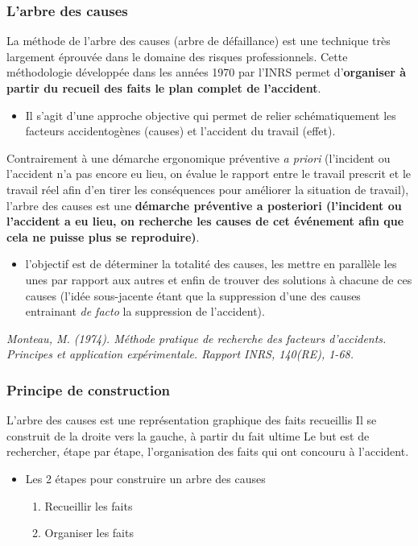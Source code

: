 \documentclass{beamer}
\begin{document}
\begin{frame}
\frametitle{L’arbre des causes}

La méthode de l'arbre des causes (arbre de défaillance) est une technique très largement éprouvée dans le domaine des risques professionnels. Cette méthodologie développée dans les années 1970 par l'INRS permet d’\textbf{organiser à partir du recueil des faits le plan complet de l’accident}.
\begin{itemize}
\item Il s’agit d’une approche objective qui permet de relier schématiquement les facteurs accidentogènes (causes) et l’accident du travail (effet). 
\end{itemize}

Contrairement à une démarche ergonomique préventive \textit{a priori} (l'incident ou l'accident n'a pas encore eu lieu, on évalue le rapport entre le travail prescrit et le travail réel afin d'en tirer les conséquences pour améliorer la situation de travail), l’arbre des causes est une \textbf{démarche préventive a posteriori (l'incident ou l'accident a eu lieu, on recherche les causes de cet événement afin que cela ne puisse plus se reproduire)}. 
\begin{itemize}
\item l’objectif est de déterminer la totalité des causes, les mettre en parallèle les unes par rapport aux autres et enfin de trouver des solutions à chacune de ces causes (l’idée sous-jacente étant que la suppression d'une des causes entrainant \textit{de facto} la suppression de l'accident). 
\end{itemize}
\textit{Monteau, M. (1974). Méthode pratique de recherche des facteurs d'accidents. Principes et application expérimentale. Rapport INRS, 140(RE), 1-68.}
\end{frame}

\begin{frame}
\frametitle{Principe de construction}

L’arbre des causes est une représentation graphique des faits recueillis
Il se construit de la droite vers la gauche, à partir du fait ultime
Le but est de rechercher, étape par étape, l’organisation des faits qui ont concouru à l’accident.
\begin{itemize}
\item Les 2 étapes pour construire un arbre des causes
\begin{enumerate}
	\item Recueillir les faits
\item Organiser les faits
\end{enumerate}
\end{itemize}
\end{frame}
\end{document}
